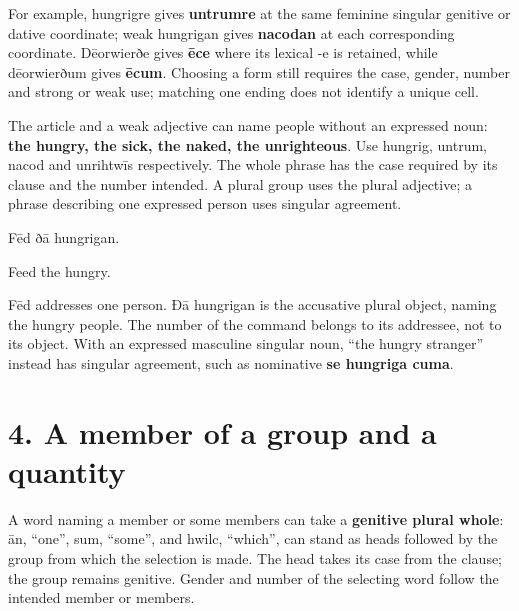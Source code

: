 For example, hungrigre gives \textbf{untrumre} at the same feminine singular genitive or dative coordinate; weak hungrigan gives \textbf{nacodan} at each corresponding coordinate. Dēorwierðe gives \textbf{ēce} where its lexical -e is retained, while dēorwierðum gives \textbf{ēcum}. Choosing a form still requires the case, gender, number and strong or weak use; matching one ending does not identify a unique cell.

The article and a weak adjective can name people without an expressed noun: \textbf{the hungry, the sick, the naked, the unrighteous}. Use hungrig, untrum, nacod and unrihtwīs respectively. The whole phrase has the case required by its clause and the number intended. A plural group uses the plural adjective; a phrase describing one expressed person uses singular agreement.

Fēd ðā hungrigan.

Feed the hungry.

Fēd addresses one person. Ðā hungrigan is the accusative plural object, naming the hungry people. The number of the command belongs to its addressee, not to its object. With an expressed masculine singular noun, “the hungry stranger” instead has singular agreement, such as nominative \textbf{se hungriga cuma}.

\section*{4. A member of a group and a quantity}

A word naming a member or some members can take a \textbf{genitive plural whole}: ān, “one”, sum, “some”, and hwilc, “which”, can stand as heads followed by the group from which the selection is made. The head takes its case from the clause; the group remains genitive. Gender and number of the selecting word follow the intended member or members.

